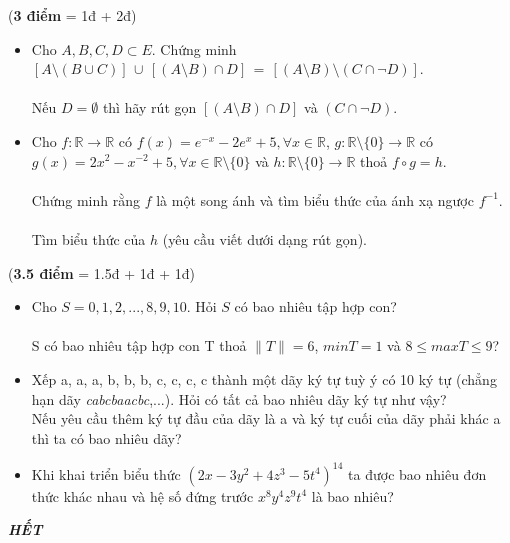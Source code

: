\documentclass[a4paper]{exam}
\begin{document}
\begin{questions}
\begin{itemize}
		\end{itemize}
		\question (\textbf{3 điểm} = 1đ + 2đ)
		\begin{itemize}
			\item Cho $ A, B, C, D \subset E$. Chứng minh $\left[A \setminus (B \cup C) \right] \, \cup \, \left[(A \setminus B) \cap D \right] \, = \, \left[(A \setminus B) \setminus (C \cap \neg D)\right]$.\\
			\\Nếu $D = \emptyset$ thì hãy rút gọn $\left[(A \setminus B) \cap D \right]$ và $(C \cap \neg D)$.\\
			\item Cho $f: \mathbb{R} \longrightarrow \mathbb{R}$ có $f(x) = e^{-x} - 2e^{x} + 5, \forall x \in \mathbb{R}$, $g: \mathbb{R} \setminus \{0\} \longrightarrow \mathbb{R}$ có $g(x) = 2x^{2} - x^{-2} + 5, \forall x \in \mathbb{R} \setminus \{0\}$ và $h: \mathbb{R} \setminus \{0\} \longrightarrow \mathbb{R}$ thoả $f \circ g = h$.\\
			\\Chứng minh rằng $f$ là một song ánh và tìm biểu thức của ánh xạ ngược $f^{-1}$.\\
			\\Tìm biểu thức của $h$ (yêu cầu viết dưới dạng rút gọn).\\
		\end{itemize}
		\question (\textbf{3.5 điểm} = 1.5đ + 1đ + 1đ)
		\begin{itemize}
			\item Cho $S = {0, 1, 2,..., 8, 9, 10}$. Hỏi $S$ có bao nhiêu tập hợp con?\\
			\\S có bao nhiêu tập hợp con T thoả $\|T\| = 6$, $minT = 1$ và $8 \leq maxT \leq 9$?\\
			\item Xếp a, a, a, b, b, b, c, c, c, c thành một dãy ký tự tuỳ ý có 10 ký tự (chẳng hạn dãy \textit{cabcbaacbc},...). Hỏi có tất cả bao nhiêu dãy ký tự như vậy?\\
			Nếu yêu cầu thêm ký tự đầu của dãy là a và ký tự cuối của dãy phải khác a thì ta có bao nhiêu dãy?\\
			\item Khi khai triển biểu thức $(2x - 3y^{2} + 4z^{3} - 5t^{4})^{14} $ ta được bao nhiêu đơn thức khác nhau và hệ số đứng trước $x^{8}y^{4}z^{9}t^{4}$ là bao nhiêu?\\ 
		\end{itemize}
	\end{questions}
	\hspace*{0pt}\hfill \textit{\textbf{HẾT}}
	
	\pagebreak
\end{document}
